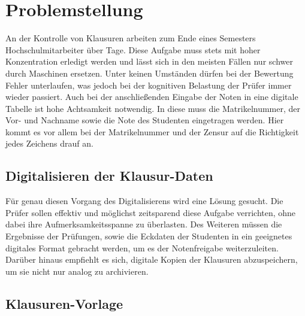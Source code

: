 \documentclass[nomenclature, oneside, 150]{HSMW-Thesis}
\begin{document}

\chapter{Problemstellung} 
	An der Kontrolle von Klausuren arbeiten zum Ende eines Semesters Hochschulmitarbeiter über Tage. Diese Aufgabe muss stets mit hoher Konzentration erledigt werden und lässt sich in den meisten Fällen nur schwer durch Maschinen ersetzen. Unter keinen Umständen dürfen bei der Bewertung Fehler unterlaufen, was jedoch bei der kognitiven Belastung der Prüfer immer wieder passiert. Auch bei der anschließenden Eingabe der Noten in eine digitale Tabelle ist hohe Achtsamkeit notwendig. In diese muss die Matrikelnummer, der Vor- und Nachname sowie die Note des Studenten eingetragen werden. Hier kommt es vor allem bei der Matrikelnummer und der Zensur auf die Richtigkeit jedes Zeichens drauf an. 
	
	\section{Digitalisieren der Klausur-Daten}
	Für genau diesen Vorgang des Digitalisierens wird eine Lösung gesucht. Die Prüfer sollen effektiv und möglichst zeitsparend diese Aufgabe verrichten, ohne dabei ihre Aufmerksamkeitsspanne zu überlasten. Des Weiteren müssen die Ergebnisse der Prüfungen, sowie die Eckdaten der Studenten in ein geeignetes digitales Format gebracht werden, um es der Notenfreigabe weiterzuleiten. Darüber hinaus empfiehlt es sich, digitale Kopien der Klausuren abzuspeichern, um sie nicht nur analog zu archivieren.
	
	\section{Klausuren-Vorlage}
	
\end{document}
